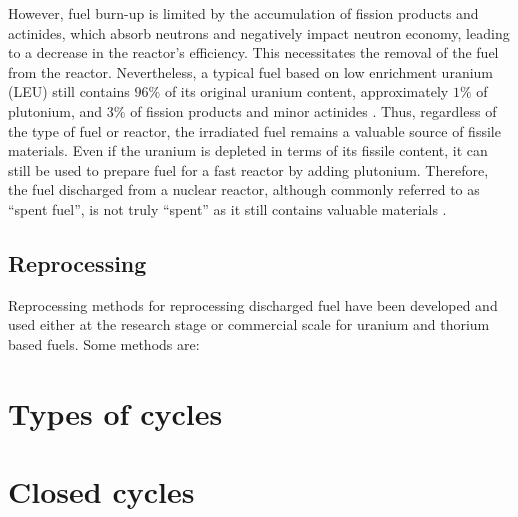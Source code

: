 However, fuel burn-up is limited by the accumulation of fission products and actinides, which absorb neutrons and negatively impact neutron economy, leading to a decrease in the reactor's efficiency. This necessitates the removal of the fuel from the reactor. Nevertheless, a typical fuel based on low enrichment uranium (LEU) still contains \(96\%\) of its original uranium content, approximately \(1\%\) of plutonium, and \(3\%\) of fission products and minor actinides \cite{fuel_cycle_book}. Thus, regardless of the type of fuel or reactor, the irradiated fuel remains a valuable source of fissile materials. Even if the uranium is depleted in terms of its fissile content, it can still be used to prepare fuel for a fast reactor by adding plutonium. Therefore, the fuel discharged from a nuclear reactor, although commonly referred to as ``spent fuel'', is not truly ``spent'' as it still contains valuable materials \cite{fuel_cycle_book}. 

\subsection{Reprocessing}

Reprocessing methods for reprocessing discharged fuel have been developed and used either at the research stage or commercial scale for uranium and thorium based fuels. Some methods are:


\section{Types of cycles}

\section{Closed cycles}

